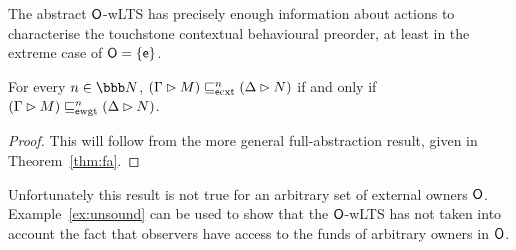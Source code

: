 \documentclass{LMCS}
\newcommand{\with}{\mathbin \rhd}
\newcommand{\nats}{\ensuremath{\bbb N}\xspace}
\newcommand{\ownO}{ {\ownfnt O}}
\newcommand{\sobs}{{\ownfnt e}}
\newcommand{\Ecxtequiv}[1]{\mathrel{\sqsubseteq_{\rm \sobs cxt}^{#1}}}
\newcommand{\Eamort}[1]{\mathrel{\sqsubseteq_{\rm \sobs wgt}^{#1}}}
\begin{document}
The abstract $\ownO$-wLTS has precisely enough information about
actions to characterise the touchstone contextual behavioural
preorder, at least in the extreme case of $\ownO = \sset{\sobs}$.
\begin{thm}\label{thm:externalfa}
   For every $n \in \nats$,  $(\Gamma \with M) \Ecxtequiv{n} (\Delta \with N)$ if and only if 
  $(\Gamma \with M) \Eamort{n} (\Delta \with N)$. 
\end{thm}
\begin{proof}
  This will follow from the more general full-abstraction result, given in Theorem~\ref{thm:fa}.
\end{proof}
Unfortunately this result is not true for an arbitrary set of external owners $\ownO$. 
Example~\ref{ex:unsound} can be used to show that the $\ownO$-wLTS has not taken into account the fact that 
observers have access to the funds of arbitrary owners in $\ownO$.
\end{document}
